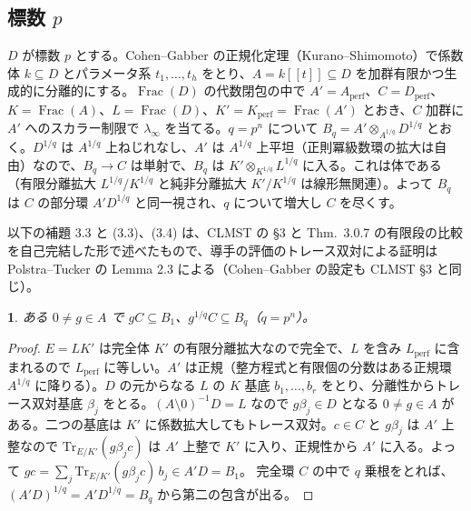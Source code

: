\documentclass[11pt,a4paper]{ltjsarticle}
\newcommand{\stmtname}{}
\theoremstyle{plain}
\newtheorem*{stmtgen}{\stmtname}
\newenvironment{stmt}[1]{\renewcommand{\stmtname}{#1}\begin{stmtgen}}{\end{stmtgen}}
\theoremstyle{definition}
\newcommand{\Frac}{\operatorname{Frac}}
\newcommand{\perf}{\mathrm{perf}}
\begin{document}
\subsection{標数 $p$}
$D$ が標数 $p$ とする。Cohen--Gabber の正規化定理（Kurano--Shimomoto）で係数体 $k\subseteq D$ とパラメータ系 $t_1,\dots,t_h$ をとり、$A = k[[t]]\subseteq D$ を加群有限かつ生成的に分離的にする。$\Frac(D)$ の代数閉包の中で
$A' = A_\perf$、$C = D_\perf$、$K = \Frac(A)$、$L = \Frac(D)$、$K' = K_\perf = \Frac(A')$
とおき、$C$ 加群に $A'$ へのスカラー制限で $\lambda_\infty$ を当てる。$q = p^n$ について
$B_q = A'\otimes_{A^{1/q}}D^{1/q}$
とおく。$D^{1/q}$ は $A^{1/q}$ 上ねじれなし、$A'$ は $A^{1/q}$ 上平坦（正則冪級数環の拡大は自由）なので、$B_q\to C$ は単射で、$B_q$ は $K'\otimes_{K^{1/q}}L^{1/q}$ に入る。これは体である（有限分離拡大 $L^{1/q}/K^{1/q}$ と純非分離拡大 $K'/K^{1/q}$ は線形無関連）。よって $B_q$ は $C$ の部分環 $A'D^{1/q}$ と同一視され、$q$ について増大し $C$ を尽くす。

以下の補題 3.3 と (3.3)、(3.4) は、CLMST の \S3 と Thm.~3.0.7 の有限段の比較を自己完結した形で述べたもので、導手の評価のトレース双対による証明は Polstra--Tucker の Lemma 2.3 による（Cohen--Gabber の設定も CLMST \S3 と同じ）。

\begin{stmt}{補題 3.3（導手の評価）}
ある $0\ne g\in A$ で $gC\subseteq B_1$、$g^{1/q}C\subseteq B_q$（$q = p^n$）。
\end{stmt}
\begin{proof}
$E = LK'$ は完全体 $K'$ の有限分離拡大なので完全で、$L$ を含み $L_\perf$ に含まれるので $L_\perf$ に等しい。$A'$ は正規（整方程式と有限個の分数はある正規環 $A^{1/q}$ に降りる）。$D$ の元からなる $L$ の $K$ 基底 $b_1,\dots,b_r$ をとり、分離性からトレース双対基底 $\beta_j$ をとる。$(A\setminus0)^{-1}D = L$ なので $g\beta_j\in D$ となる $0\ne g\in A$ がある。二つの基底は $K'$ に係数拡大してもトレース双対。$c\in C$ と $g\beta_j$ は $A'$ 上整なので $\mathrm{Tr}_{E/K'}(g\beta_jc)$ は $A'$ 上整で $K'$ に入り、正規性から $A'$ に入る。よって
$gc = \sum_j\mathrm{Tr}_{E/K'}(g\beta_jc)\,b_j\in A'D = B_1$。
完全環 $C$ の中で $q$ 乗根をとれば、$(A'D)^{1/q} = A'D^{1/q} = B_q$ から第二の包含が出る。
\end{proof}
\end{document}

